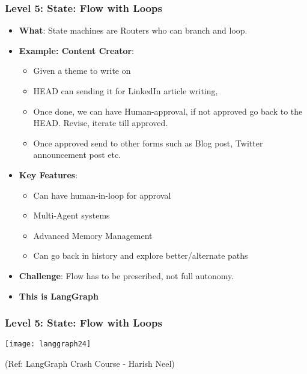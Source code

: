 \begin{frame}[fragile]\frametitle{Level 5: State: Flow with Loops}
      \begin{itemize}
        \item \textbf{What}: State machines are Routers who can branch and loop.
        \item \textbf{Example: Content Creator}:
        \begin{itemize}
            \item Given a theme to write on
			\item HEAD can sending it for LinkedIn article writing, 
			\item Once done, we can have Human-approval, if not approved go back to the HEAD. Revise, iterate till approved.
			\item Once approved send to other forms such as Blog post, Twitter announcement post etc.
        \end{itemize}
        \item \textbf{Key Features}: 
        \begin{itemize}
            \item Can have human-in-loop for approval
			\item Multi-Agent systems
			\item Advanced Memory Management
			\item Can go back in history and explore better/alternate paths
        \end{itemize}		
        \item \textbf{Challenge}: Flow has to be prescribed, not full autonomy.
        \item \textbf{This is LangGraph}
      \end{itemize}
\end{frame}

\begin{frame}[fragile]\frametitle{Level 5: State: Flow with Loops}
\begin{center}
\texttt{[image: langgraph24]}

{\tiny (Ref: LangGraph Crash Course - Harish Neel)}
\end{center}	  
\end{frame}

